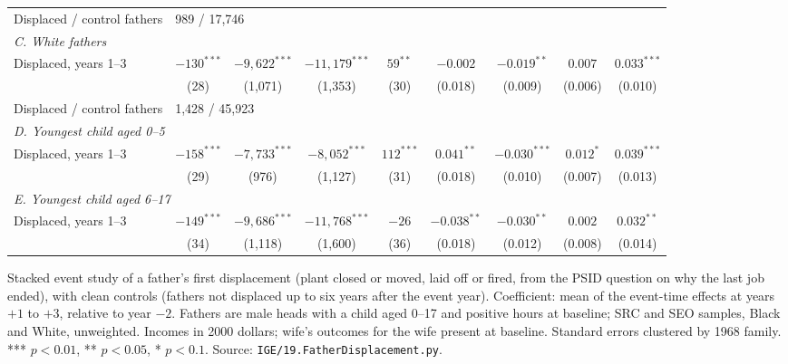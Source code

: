 \begin{table}[htbp]
{\begin{tabular}{lcccccccc}
Displaced / control fathers & \multicolumn{8}{l}{989 / 17,746} \\
\multicolumn{9}{l}{\textit{C. White fathers}} \\
Displaced, years 1--3 & $-130^{***}$ & $-9,622^{***}$ & $-11,179^{***}$ & $59^{**}$ & $-0.002$ & $-0.019^{**}$ & $0.007$ & $0.033^{***}$ \\
 & (28) & (1,071) & (1,353) & (30) & (0.018) & (0.009) & (0.006) & (0.010) \\
Displaced / control fathers & \multicolumn{8}{l}{1,428 / 45,923} \\
\multicolumn{9}{l}{\textit{D. Youngest child aged 0--5}} \\
Displaced, years 1--3 & $-158^{***}$ & $-7,733^{***}$ & $-8,052^{***}$ & $112^{***}$ & $0.041^{**}$ & $-0.030^{***}$ & $0.012^{*}$ & $0.039^{***}$ \\
 & (29) & (976) & (1,127) & (31) & (0.018) & (0.010) & (0.007) & (0.013) \\
\multicolumn{9}{l}{\textit{E. Youngest child aged 6--17}} \\
Displaced, years 1--3 & $-149^{***}$ & $-9,686^{***}$ & $-11,768^{***}$ & $-26$ & $-0.038^{**}$ & $-0.030^{**}$ & $0.002$ & $0.032^{**}$ \\
 & (34) & (1,118) & (1,600) & (36) & (0.018) & (0.012) & (0.008) & (0.014) \\
\bottomrule
\end{tabular}}
\begin{minipage}{0.95\textwidth}\footnotesize Stacked event study of a father's first displacement (plant closed or moved, laid off or fired, from the PSID question on why the last job ended), with clean controls (fathers not displaced up to six years after the event year). Coefficient: mean of the event-time effects at years $+1$ to $+3$, relative to year $-2$. Fathers are male heads with a child aged 0--17 and positive hours at baseline; SRC and SEO samples, Black and White, unweighted. Incomes in 2000 dollars; wife's outcomes for the wife present at baseline. Standard errors clustered by 1968 family. *** $p<0.01$, ** $p<0.05$, * $p<0.1$. Source: \texttt{IGE/19.FatherDisplacement.py}.\end{minipage}
\end{table}
